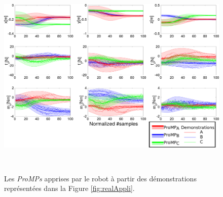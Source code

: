 \documentclass[utf8]{frontiersSCNS} %
\begin{document}
\begin{figure}[!h]
\centering
\includegraphics[height = 10cm]{img/realDistribution.pdf} 
\caption{Les \textit{ProMPs} apprises par le robot à partir des démonstrations représentées dans la Figure \ref{fig:realAppli}.}
\label{fig:realDistribution}
\end{figure}
\end{document}
